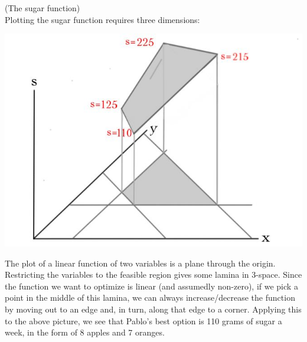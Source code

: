 \begin{example}(The sugar function)\\
Plotting the sugar function requires three dimensions:
\vspace{-1.5mm}
\begin{center}
\hspace{-1cm}\includegraphics[scale=.38]{simplex/sugar.jpg}
\end{center}
\end{example} 

The plot of a linear function of two variables is a plane through the origin. 
Restricting the variables to the feasible region gives some lamina in 3-space.
Since the function we want to optimize is linear (and assumedly non-zero), 
if we pick a point in the middle of this lamina, we can always increase/decrease 
the function by moving out to an edge and, in turn, along that edge to a corner.
Applying this to the above picture,  we see that Pablo's best option is 110 grams of sugar a week, in the form of 
8 apples and 7 oranges.

